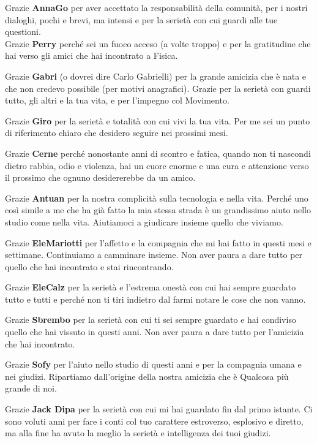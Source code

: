 Grazie \textbf{AnnaGo} per aver accettato la responsabilità della comunità, per i nostri dialoghi, pochi e brevi, ma intensi e per la serietà con cui guardi alle tue questioni. \\


Grazie \textbf{Perry} perché sei un fuoco acceso (a volte troppo) e per la gratitudine che hai verso gli amici che hai incontrato a Fisica.

Grazie \textbf{Gabri} (o dovrei dire Carlo Gabrielli) per la grande amicizia che è nata e che non credevo possibile (per motivi anagrafici). Grazie per la serietà con guardi tutto, gli altri e la tua vita, e per l'impegno col Movimento.

Grazie \textbf{Giro} per la serietà e totalità con cui vivi la tua vita. Per me sei un punto di riferimento chiaro che desidero seguire nei prossimi mesi.

Grazie \textbf{Cerne} perché nonostante anni di scontro e fatica, quando non ti nascondi dietro rabbia, odio e violenza, hai un cuore enorme e una cura e attenzione verso il prossimo che ognuno desidererebbe da un amico.

Grazie \textbf{Antuan} per la nostra complicità sulla tecnologia e nella vita. Perché uno così simile a me che ha già fatto la mia stessa strada è un grandissimo aiuto nello studio come nella vita. Aiutiamoci a giudicare insieme quello che viviamo.

Grazie \textbf{EleMariotti} per l'affetto e la compagnia che mi hai fatto in questi mesi e settimane. Continuiamo a camminare insieme. Non aver paura a dare tutto per quello che hai incontrato e stai rincontrando.

Grazie \textbf{EleCalz} per la serietà e l'estrema onestà con cui hai sempre guardato tutto e tutti e perché non ti tiri indietro dal farmi notare le cose che non vanno.

Grazie \textbf{Sbrembo} per la serietà con cui ti sei sempre guardato e hai condiviso quello che hai vissuto in questi anni. Non aver paura a dare tutto per l'amicizia che hai incontrato.

Grazie \textbf{Sofy} per l'aiuto nello studio di questi anni e per la compagnia umana e nei giudizi. Ripartiamo dall'origine della nostra amicizia che è Qualcosa più grande di noi.

Grazie \textbf{Jack Dipa} per la serietà con cui mi hai guardato fin dal primo istante. Ci sono voluti anni per fare i conti col tuo carattere estroverso, esplosivo e diretto, ma alla fine ha avuto la meglio la serietà e intelligenza dei tuoi giudizi.

